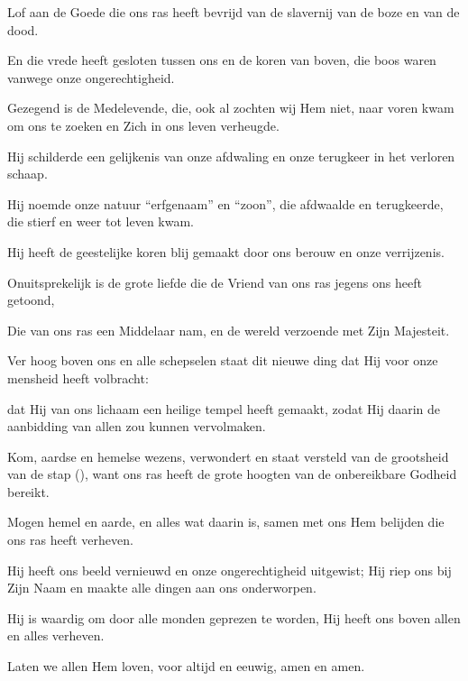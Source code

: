 \documentclass[12pt,twoside,a5paper]{article}
\begin{document}




\begin{halfparskip}
  Lof aan de Goede die ons ras heeft bevrijd van de slavernij van de boze en van de dood.

  En die vrede heeft gesloten tussen ons en de koren van boven, die boos waren vanwege onze ongerechtigheid.

  Gezegend is de Medelevende, die, ook al zochten wij Hem niet, naar voren kwam om ons te zoeken en Zich in ons leven verheugde.

  Hij schilderde een gelijkenis van onze afdwaling en onze terugkeer in het verloren schaap.

  Hij noemde onze natuur ``erfgenaam'' en ``zoon'', die afdwaalde en terugkeerde, die stierf en weer tot leven kwam.

  Hij heeft de geestelijke koren blij gemaakt door ons berouw en onze verrijzenis.

  Onuitsprekelijk is de grote liefde die de Vriend van ons ras jegens ons heeft getoond,

  Die van ons ras een Middelaar nam, en de wereld verzoende met Zijn Majesteit.

  Ver hoog boven ons en alle schepselen staat dit nieuwe ding dat Hij voor onze mensheid heeft volbracht:

  dat Hij van ons lichaam een heilige tempel heeft gemaakt, zodat Hij daarin de aanbidding van allen zou kunnen vervolmaken.

  Kom, aardse en hemelse wezens, verwondert en staat versteld van de grootsheid van de stap (), want ons ras heeft de grote hoogten van de onbereikbare Godheid bereikt.

  Mogen hemel en aarde, en alles wat daarin is, samen met ons Hem belijden die ons ras heeft verheven.

  Hij heeft ons beeld vernieuwd en onze ongerechtigheid uitgewist; Hij riep ons bij Zijn Naam en maakte alle dingen aan ons onderworpen.

  Hij is waardig om door alle monden geprezen te worden, Hij heeft ons boven allen en alles verheven.

  Laten we allen Hem loven, voor altijd en eeuwig, amen en amen.
\end{halfparskip}
\end{document}
